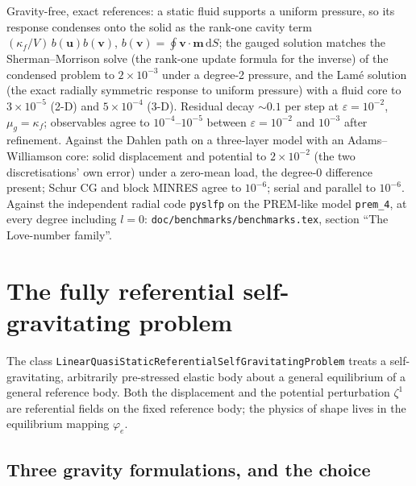 \documentclass[11pt]{article}
\numberwithin{equation}{section}
\theoremstyle{remark}
\newcommand{\eps}{\varepsilon}
\newcommand{\dS}{\,\mathrm{d}S}
\newcommand{\vu}{\mathbf{u}}
\newcommand{\vv}{\mathbf{v}}
\newcommand{\vm}{\mathbf{m}}
\newcommand{\code}[1]{\texttt{#1}}
\begin{document}
Gravity-free, exact references: a static fluid supports a uniform pressure,
so its response condenses onto the solid as the rank-one cavity term
$(\kappa_f/V)\,b(\vu)b(\vv)$, $b(\vv) = \oint\vv\cdot\vm\dS$; the gauged
solution matches the Sherman--Morrison solve (the rank-one update formula
for the inverse) of the condensed problem to $2\times10^{-3}$ under a
degree-2 pressure, and the Lam\'e solution (the exact radially symmetric
response to uniform pressure) with a
fluid core to $3\times10^{-5}$ (2-D) and $5\times10^{-4}$ (3-D). Residual
decay $\sim0.1$ per step at $\eps = 10^{-2}$, $\mu_g = \kappa_f$;
observables agree to $10^{-4}$--$10^{-5}$ between $\eps = 10^{-2}$ and
$10^{-3}$ after refinement. Against the Dahlen path on a three-layer model
with an Adams--Williamson core: solid displacement and potential to
$2\times10^{-2}$ (the two discretisations' own error) under a zero-mean
load, the degree-0 difference present; Schur CG and block MINRES agree to
$10^{-6}$; serial and parallel to $10^{-6}$. Against the independent radial
code \code{pyslfp} on the PREM-like model \code{prem\_4}, at every degree
including $l = 0$: \code{doc/benchmarks/benchmarks.tex}, section ``The Love-number
family''.

\section{The fully referential self-gravitating problem}
\label{sec:referential}

The class \code{LinearQuasiStaticReferentialSelfGravitatingProblem} treats
a self-gravitating, arbitrarily pre-stressed elastic body about a general
equilibrium of a general reference body. Both the displacement and the
potential perturbation $\zeta^1$ are referential fields on the fixed
reference body; the physics of shape lives in the equilibrium mapping
$\varphi_e$.

\subsection{Three gravity formulations, and the choice}
\end{document}

